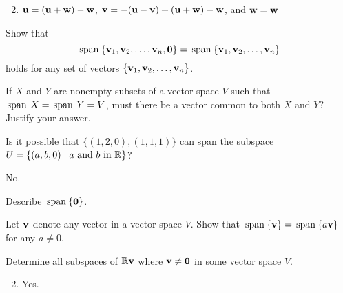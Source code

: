 \begin{multicols}{2}
\begin{ex}
\begin{enumerate}[label={\alph*.}]
\end{enumerate}
\begin{sol}
\begin{enumerate}[label={\alph*.}]
\setcounter{enumi}{1}
\item  $\textbf{u} = (\textbf{u} + \textbf{w}) - \textbf{w}$, $\textbf{v} = -(\textbf{u} - \textbf{v}) + (\textbf{u} + \textbf{w}) - \textbf{w}$, and $\textbf{w} = \textbf{w}$

\end{enumerate}
\end{sol}
\end{ex}

\begin{ex}
Show that 
\begin{equation*}
\thinspace\operatorname{span\medspace}\{\textbf{v}_{1}, \textbf{v}_{2}, \dots, \textbf{v}_{n}, \textbf{0}\} = \thinspace\operatorname{span\medspace}\{\textbf{v}_{1}, \textbf{v}_{2}, \dots, \textbf{v}_{n}\}
\end{equation*}
holds for any set of vectors $\{\textbf{v}_{1}, \textbf{v}_{2}, \dots, \textbf{v}_{n}\}$.
\end{ex}

\begin{ex}
If $X$ and $Y$ are nonempty subsets of a vector space $V$ such that $\thinspace\operatorname{span\medspace} X = \thinspace\operatorname{span\medspace} Y = V$, must there be a vector common to both $X$ and $Y$? Justify your answer.
\end{ex}

\begin{ex}
Is it possible that $\{(1, 2, 0), (1, 1, 1)\}$ can span the subspace $U = \{(a, b, 0) \mid a \mbox{ and } b \mbox{ in } \mathbb{R}\}$?

\begin{sol}
No. 
\end{sol}
\end{ex}

\begin{ex}
Describe $\thinspace\operatorname{span\medspace}\{\textbf{0}\}$.
\end{ex}

\begin{ex}
Let $\textbf{v}$ denote any vector in a vector space $V$. Show that $\thinspace\operatorname{span\medspace}\{\textbf{v}\} = \thinspace\operatorname{span\medspace}\{a\textbf{v}\}$ for any $a \neq 0$.
\end{ex}

\begin{ex}
Determine all subspaces of $\mathbb{R}\textbf{v}$ where $\textbf{v} \neq \textbf{0}$ in some vector space $V$.

\begin{sol}
\begin{enumerate}[label={\alph*.}]
\setcounter{enumi}{1}
\item  Yes.


\end{enumerate}
\end{sol}
\end{ex}
\end{multicols}
